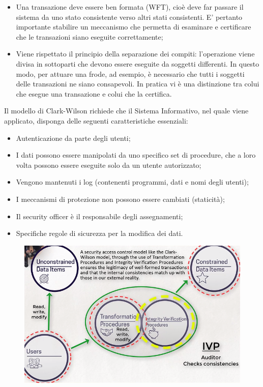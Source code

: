 \begin{itemize}
      \item Una transazione deve essere ben formata (WFT), cioè deve far passare
            il sistema da uno
            stato consistente verso altri stati consistenti. E' pertanto
            importante stabilire un
            meccanismo che permetta di esaminare e certificare che le transazioni
            siano eseguite
            correttamente;
      \item Viene rispettato il principio della separazione dei compiti:
            l'operazione viene divisa in
            sottoparti che devono essere eseguite da soggetti differenti.
            In questo modo, per attuare
            una frode, ad esempio, è necessario che tutti i soggetti delle
            transazioni ne siano
            consapevoli. In pratica vi è una distinzione tra colui che esegue
            una transazione e colui che
            la certifica.
\end{itemize}

Il modello di Clark-Wilson richiede che il Sistema Informativo, nel quale viene
applicato, disponga
delle seguenti caratteristiche essenziali:

\begin{itemize}
      \item Autenticazione da parte degli utenti;
      \item I dati possono essere manipolati da uno specifico set di procedure,
            che a loro volta
            possono essere eseguite solo da un utente autorizzato;
      \item Vengono mantenuti i log (contenenti programmi, dati e nomi degli
            utenti);
      \item I meccanismi di protezione non possono essere cambiati (staticità);
      \item Il security officer è il responsabile degli assegnamenti;
      \item Specifiche regole di sicurezza per la modifica dei dati.
\end{itemize}

\begin{figure}[H]
      \centering
      \includegraphics[width=12cm, keepaspectratio]{capitoli/policy/imgs/clark_wilson3.png}
\end{figure}

